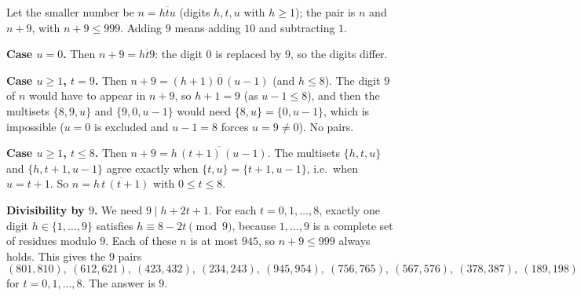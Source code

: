 Let the smaller number be $n=\overline{htu}$ (digits $h,t,u$ with $h\ge1$); the pair is $n$ and $n+9$, with $n+9\le999$. Adding $9$ means adding $10$ and subtracting $1$.

\textbf{Case $u=0$.} Then $n+9=\overline{ht9}$: the digit $0$ is replaced by $9$, so the digits differ.

\textbf{Case $u\ge1$, $t=9$.} Then $n+9=\overline{(h+1)\,0\,(u-1)}$ (and $h\le8$). The digit $9$ of $n$ would have to appear in $n+9$, so $h+1=9$ (as $u-1\le8$), and then the multisets $\{8,9,u\}$ and $\{9,0,u-1\}$ would need $\{8,u\}=\{0,u-1\}$, which is impossible ($u=0$ is excluded and $u-1=8$ forces $u=9\ne0$). No pairs.

\textbf{Case $u\ge1$, $t\le8$.} Then $n+9=\overline{h\,(t+1)\,(u-1)}$. The multisets $\{h,t,u\}$ and $\{h,t+1,u-1\}$ agree exactly when $\{t,u\}=\{t+1,u-1\}$, i.e.\ when $u=t+1$. So $n=\overline{h\,t\,(t+1)}$ with $0\le t\le8$.

\textbf{Divisibility by $9$.} We need $9\mid h+2t+1$. For each $t=0,1,\dots,8$, exactly one digit $h\in\{1,\dots,9\}$ satisfies $h\equiv8-2t\pmod9$, because $1,\dots,9$ is a complete set of residues modulo $9$. Each of these $n$ is at most $945$, so $n+9\le999$ always holds. This gives the $9$ pairs
\[
(801,810),\ (612,621),\ (423,432),\ (234,243),\ (945,954),\ (756,765),\ (567,576),\ (378,387),\ (189,198)
\]
for $t=0,1,\dots,8$. The answer is $\boxed{9}$.
